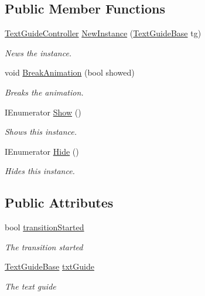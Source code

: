 \subsection*{Public Member Functions}
\begin{DoxyCompactItemize}
\item 
\hyperlink{class_lerp2_a_p_i_1_1_effects_1_1___text_1_1_controllers_1_1_text_guide_controller}{Text\+Guide\+Controller} \hyperlink{class_lerp2_a_p_i_1_1_effects_1_1___text_1_1_controllers_1_1_text_guide_controller_a481f8bb7edf35cde4fbbd9c6c3392121}{New\+Instance} (\hyperlink{class_lerp2_a_p_i_1_1_effects_1_1___text_1_1_text_guide_base}{Text\+Guide\+Base} tg)
\begin{DoxyCompactList}\small\item\em News the instance. \end{DoxyCompactList}\item 
void \hyperlink{class_lerp2_a_p_i_1_1_effects_1_1___text_1_1_controllers_1_1_text_guide_controller_aca027581c9da94b346958d257b940f5b}{Break\+Animation} (bool showed)
\begin{DoxyCompactList}\small\item\em Breaks the animation. \end{DoxyCompactList}\item 
I\+Enumerator \hyperlink{class_lerp2_a_p_i_1_1_effects_1_1___text_1_1_controllers_1_1_text_guide_controller_a350f2fd162a7256262ec14fee03210ce}{Show} ()
\begin{DoxyCompactList}\small\item\em Shows this instance. \end{DoxyCompactList}\item 
I\+Enumerator \hyperlink{class_lerp2_a_p_i_1_1_effects_1_1___text_1_1_controllers_1_1_text_guide_controller_a277a3e844f6b721a672dceccf77dd0b2}{Hide} ()
\begin{DoxyCompactList}\small\item\em Hides this instance. \end{DoxyCompactList}\end{DoxyCompactItemize}
\subsection*{Public Attributes}
\begin{DoxyCompactItemize}
\item 
bool \hyperlink{class_lerp2_a_p_i_1_1_effects_1_1___text_1_1_controllers_1_1_text_guide_controller_ac2ba6cf8d707d6200b60ae9e75d71336}{transition\+Started}
\begin{DoxyCompactList}\small\item\em The transition started \end{DoxyCompactList}\item 
\hyperlink{class_lerp2_a_p_i_1_1_effects_1_1___text_1_1_text_guide_base}{Text\+Guide\+Base} \hyperlink{class_lerp2_a_p_i_1_1_effects_1_1___text_1_1_controllers_1_1_text_guide_controller_a07de4aa8b134094ab06de9ebb71932f1}{txt\+Guide}
\begin{DoxyCompactList}\small\item\em The text guide \end{DoxyCompactList}\end{DoxyCompactItemize}
